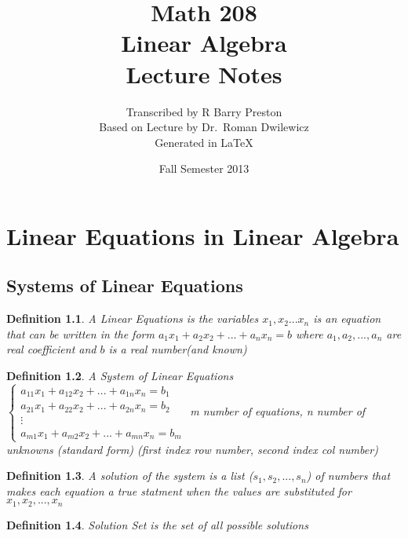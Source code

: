 \documentclass[a4paper,12pt,openany]{book}
\title{Math 208\\Linear Algebra\\Lecture Notes}
\date{Fall Semester 2013}
\author{Transcribed by R Barry Preston\\Based on Lecture by Dr.~Roman Dwilewicz\\Generated in \LaTeX{}}
\theoremstyle{defn}
\newtheorem{defn}{Definition}[section]
\theoremstyle{expl}
\begin{document}
\maketitle
\tableofcontents 
\chapter{Linear Equations in Linear Algebra}
\section{Systems of Linear Equations}

\begin{defn}
	\textup{A Linear Equations is the variables $x_1,x_2...x_n$ is an equation that can be written in the form $a_1x_1+a_2x_2+...+a_nx_n = b$ where $a_1,a_2, ..., a_n$ are real coefficient and $b$ is a real number(and known)}
\end{defn}
\begin{defn}
	\textup{A System of Linear Equations
	$\left\{\begin{array}{c}
		a_{11}x_1+a_{12}x_2+...+a_{1n}x_n = b_1\\
		a_{21}x_1+a_{22}x_2+...+a_{2n}x_n = b_2\\
		\vdots\\
		a_{m1}x_1+a_{m2}x_2+...+a_{mn}x_n = b_m
	\end{array} \right.$
	m number of equations, n number of unknowns (standard form) (first index row number, second index col number)}\end{defn}
\begin{defn}\textup{A solution of the system is a list ($s_1,s_2,...,s_n$) of numbers that makes each equation a true statment when the values are substituted for $x_1,x_2,...,x_n$}\end{defn}
\begin{defn}\textup{Solution Set is the set of all possible solutions}\end{defn}
\end{document}
